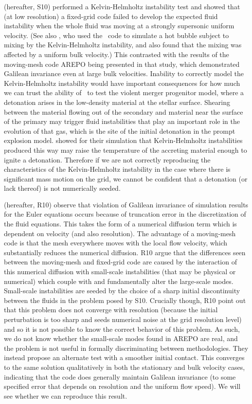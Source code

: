 \documentclass[12pt]{article}
\begin{document}
\citet{arepo} (hereafter, S10) performed a Kelvin-Helmholtz instability test and showed
that (at low resolution) a fixed-grid code failed to develop the
expected fluid instability when the whole fluid was moving at a
strongly supersonic uniform velocity. (See also \citet{wadsley:2008}, 
who used the \flash\ code to simulate a hot bubble subject to mixing 
by the Kelvin-Helmholtz instability, and also found that the mixing was affected by a 
uniform bulk velocity.) This contrasted with the results
of the moving-mesh code AREPO being presented in that study, which
demonstrated Galilean invariance even at large bulk velocities. 
Inability to correctly model the Kelvin-Helmholtz instability would 
have important consequences for how much we can trust the ability of 
\castro\ to test the violent merger progenitor model, where a detonation 
arises in the low-density material at the stellar surface. Shearing between 
the material flowing out of the secondary and material near the 
surface of the primary may trigger fluid
instabilities that play an important role in the evolution of that
gas, which is the site of the initial detonation in the prompt
explosion model. \citet{guillochon:2010} showed for their simulation
that Kelvin-Helmholtz instabilities produced this way may raise the
temperature of the accreting material enough to ignite a
detonation. Therefore if we are not correctly reproducing the
characteristics of the Kelvin-Helmholtz instability in the case where
there is significant mass motion on the grid, we cannot be confident
that a detonation (or lack thereof) is not numerically
seeded. 

\citet{robertson:2010} (hereafter, R10) observe that violation of Galilean
invariance of simulation results for the Euler equations occurs 
because of truncation error in the discretization of the fluid
equations. This takes the form of a numerical diffusion term which is
dependent on velocity (and also resolution). The advantage of a
moving-mesh code is that the mesh everywhere moves with the local flow
velocity, which substantially reduces the numerical
diffusion. R10 argue that the differences seen
between the moving-mesh and fixed-grid code are caused by the
interaction of this numerical diffusion with small-scale instabilities
(that may be physical or numerical) which couple with and
fundamentally alter the large-scale modes. Small-scale instabilities
are seeded by the choice of a sharp initial discontinuity between the 
fluids in the problem posed by S10. Crucially though,
R10 point out that this problem does not
converge with resolution (because the initial perturbation is too sharp 
and seeds numerical noise at the grid resolution level) 
and so it is not possible to know the correct
behavior of this problem. As such, we do not know whether the
small-scale modes found in AREPO are real, and the problem is not
useful in formally discriminating between methodologies. They instead
propose an alternate test with a smoother initial contact. This
converges to the same solution qualitatively in both the stationary
and bulk velocity cases, indicating that the code does generally
maintain Galilean invariance (to some specified error that depends on
resolution and the uniform flow speed).  We will see whether we can
reproduce this result.
\end{document}
